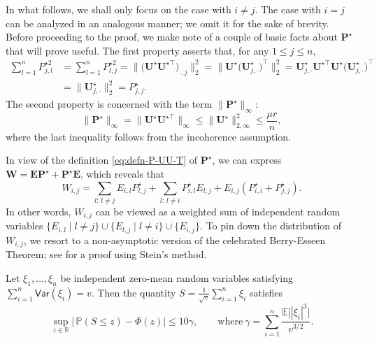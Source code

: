 In what follows, we shall only focus on the case with $i\neq j$. The case with $i=j$ can be analyzed in an analogous manner; we omit it for the sake of brevity.
Before proceeding to the proof, we make note of a couple of basic facts about $\bm{P}^{\star}$ that will prove useful.  
The first property asserts that, for any $1\leq j\leq n$, 
%
\begin{align}
\sum_{l=1}^{n}P_{j,l}^{\star2} & =\sum_{l=1}^{n}P_{l,j}^{\star2}=\big\|\big(\bm{U}^{\star}\bm{U}^{\star\top}\big)_{\cdot,j}\big\|_{2}^{2}=\big\|\bm{U}^{\star}\big(\bm{U}_{j,\cdot}^{\star}\big)^{\top}\big\|_{2}^{2}=\bm{U}_{j,\cdot}^{\star}\bm{U}^{\star\top}\bm{U}^{\star}\big(\bm{U}_{j,\cdot}^{\star}\big)^{\top}\nonumber \\
 & =\big\|\bm{U}_{j,\cdot}^{\star}\big\|_{2}^{2}=P_{j,j}^{\star}.
	\label{eq:P-jl-square-sum}
\end{align}
%
The second property is concerned with the term $\|\bm{P}^{\star}\|_{\infty}$:  
%
\begin{equation}
	\|\bm{P}^{\star}\|_{\infty}=\|\bm{U}^{\star}\bm{U}^{\star\top}\|_{\infty}\leq\|\bm{U}^{\star}\|_{2,\infty}^{2}\leq\frac{\mu r}{n},
	\label{eq:P-inf-norm-UB}
\end{equation}
%
where the last inequality follows from the incoherence assumption. 




In view of the definition \eqref{eq:defn-P-UU-T} of $\bm{P}^{\star}$, we can express $\bm{W}=\bm{E}\bm{P}^{\star}+\bm{P}^{\star}\bm{E}$, which reveals that 
%
\begin{equation}
	W_{i,j}
	=\sum_{l:\,l\neq j}E_{i,l}P^{\star}_{l,j}+\sum_{l:\,l\neq i}P^{\star}_{i,l}E_{l,j}+E_{i,j}(P^{\star}_{i,i}+P^{\star}_{j,j}).
\end{equation}
%
In other words,  $W_{i,j}$ can be viewed as a weighted sum of independent random variables $\{E_{i,l}\mid l\neq j\} \cup \{E_{l,j}\mid l\neq i\} \cup \{E_{i,j}\}$. 
To pin down the distribution of $W_{i,j}$, we resort to a non-asymptotic
version of the celebrated Berry-Esseen Theorem; 
see \citet[Theorem 3.7]{chen2010normal} for a proof using Stein's method.
%
\begin{theorem}\label{thm:berry-esseen}
Let $\xi_{1},\ldots,\xi_{n}$ be independent zero-mean random variables satisfying $\sum_{i=1}^{n}\mathsf{Var}(\xi_{i})= v$.
Then the quantity $S= \frac{1}{\sqrt{v}} \sum_{i=1}^{n}\xi_{i}$ satisfies 
%
\[
	\sup_{z\in\mathbb{R}}\big|\,\mathbb{P}\left(S\leq z\right)-\Phi\left(z\right)\big|\leq10\gamma,\qquad\text{where}\ \gamma
	=\sum_{i=1}^{n} \frac{\mathbb{E}\big[|\xi_{i}|^{3}\big] }{ v^{3/2} }.
\]
%
\end{theorem}






